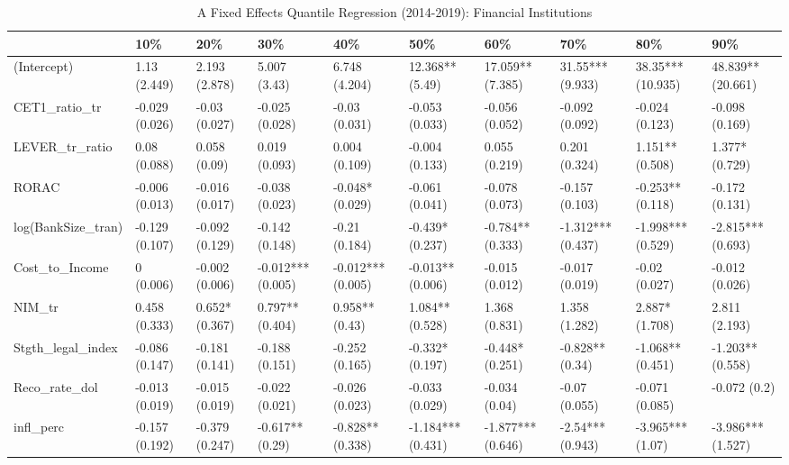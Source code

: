 \begin{table}[ht]
\centering
\caption{A Fixed Effects Quantile Regression (2014-2019): Financial Institutions} 
\begingroup\small
\begin{tabular}{llllllllll}
  \toprule
 & 10\% & 20\% & 30\% & 40\% & 50\% & 60\% & 70\% & 80\% & 90\% \\ 
  \midrule
(Intercept) & 1.13 (2.449) & 2.193 (2.878) & 5.007 (3.43) & 6.748 (4.204) & 12.368** (5.49) & 17.059** (7.385) & 31.55*** (9.933) & 38.35*** (10.935) & 48.839** (20.661) \\ 
  CET1\_ratio\_tr & -0.029 (0.026) & -0.03 (0.027) & -0.025 (0.028) & -0.03 (0.031) & -0.053 (0.033) & -0.056 (0.052) & -0.092 (0.092) & -0.024 (0.123) & -0.098 (0.169) \\ 
  LEVER\_tr\_ratio & 0.08 (0.088) & 0.058 (0.09) & 0.019 (0.093) & 0.004 (0.109) & -0.004 (0.133) & 0.055 (0.219) & 0.201 (0.324) & 1.151** (0.508) & 1.377* (0.729) \\ 
  RORAC & -0.006 (0.013) & -0.016 (0.017) & -0.038 (0.023) & -0.048* (0.029) & -0.061 (0.041) & -0.078 (0.073) & -0.157 (0.103) & -0.253** (0.118) & -0.172 (0.131) \\ 
  log(BankSize\_tran) & -0.129 (0.107) & -0.092 (0.129) & -0.142 (0.148) & -0.21 (0.184) & -0.439* (0.237) & -0.784** (0.333) & -1.312*** (0.437) & -1.998*** (0.529) & -2.815*** (0.693) \\ 
  Cost\_to\_Income & 0 (0.006) & -0.002 (0.006) & -0.012*** (0.005) & -0.012*** (0.005) & -0.013** (0.006) & -0.015 (0.012) & -0.017 (0.019) & -0.02 (0.027) & -0.012 (0.026) \\ 
  NIM\_tr & 0.458 (0.333) & 0.652* (0.367) & 0.797** (0.404) & 0.958** (0.43) & 1.084** (0.528) & 1.368 (0.831) & 1.358 (1.282) & 2.887* (1.708) & 2.811 (2.193) \\ 
  Stgth\_legal\_index & -0.086 (0.147) & -0.181 (0.141) & -0.188 (0.151) & -0.252 (0.165) & -0.332* (0.197) & -0.448* (0.251) & -0.828** (0.34) & -1.068** (0.451) & -1.203** (0.558) \\ 
  Reco\_rate\_dol & -0.013 (0.019) & -0.015 (0.019) & -0.022 (0.021) & -0.026 (0.023) & -0.033 (0.029) & -0.034 (0.04) & -0.07 (0.055) & -0.071 (0.085) & -0.072 (0.2) \\ 
  infl\_perc & -0.157 (0.192) & -0.379 (0.247) & -0.617** (0.29) & -0.828** (0.338) & -1.184*** (0.431) & -1.877*** (0.646) & -2.54*** (0.943) & -3.965*** (1.07) & -3.986*** (1.527) \\ 

\end{tabular}
\end{table}
